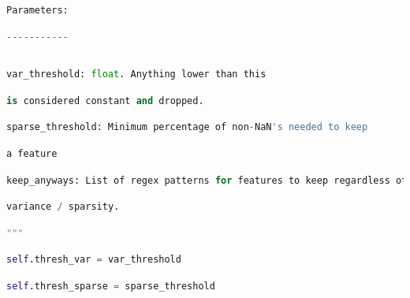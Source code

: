 \documentclass[
  11pt,
  a4paper,
  DIV=12,captions=tableheading,oneside]{scrbook}
\begin{document}
\begin{lstlisting}[language=Python,stepnumber=2,basicstyle=\footnotesize]
\end{lstlisting}
\begin{lstlisting}[language=Python,stepnumber=2,basicstyle=\footnotesize]
        Parameters:\end{lstlisting}
\begin{lstlisting}[language=Python,stepnumber=2,basicstyle=\footnotesize]
        -----------\end{lstlisting}
\begin{lstlisting}[language=Python,stepnumber=2,basicstyle=\footnotesize]
\end{lstlisting}
\begin{lstlisting}[language=Python,stepnumber=2,basicstyle=\footnotesize]
        var_threshold: float. Anything lower than this\end{lstlisting}
\begin{lstlisting}[language=Python,stepnumber=2,basicstyle=\footnotesize]
                       is considered constant and dropped.\end{lstlisting}
\begin{lstlisting}[language=Python,stepnumber=2,basicstyle=\footnotesize]
        sparse_threshold: Minimum percentage of non-NaN's needed to keep\end{lstlisting}
\begin{lstlisting}[language=Python,stepnumber=2,basicstyle=\footnotesize]
                          a feature\end{lstlisting}
\begin{lstlisting}[language=Python,stepnumber=2,basicstyle=\footnotesize]
        keep_anyways: List of regex patterns for features to keep regardless of\end{lstlisting}
\begin{lstlisting}[language=Python,stepnumber=2,basicstyle=\footnotesize]
            variance / sparsity.\end{lstlisting}
\begin{lstlisting}[language=Python,stepnumber=2,basicstyle=\footnotesize]
        """\end{lstlisting}
\begin{lstlisting}[language=Python,stepnumber=2,basicstyle=\footnotesize]
        self.thresh_var = var_threshold\end{lstlisting}
\begin{lstlisting}[language=Python,stepnumber=2,basicstyle=\footnotesize]
        self.thresh_sparse = sparse_threshold\end{lstlisting}
\end{document}
